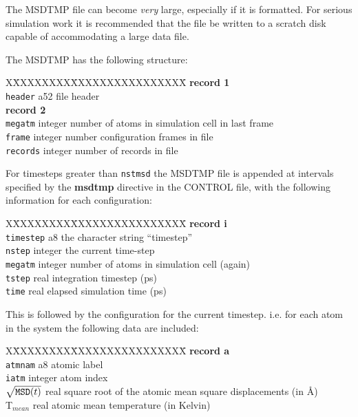 The MSDTMP file can become {\em very} large, especially if it is
formatted.  For serious simulation work it is recommended that the
file be written to a scratch disk capable of accommodating a large
data file.

The MSDTMP has the following structure:
\begin{tabbing}
X\=XXXXXXXX\=XXXXXXXXXXXXXXXX\=\kill
{\bf record 1} \\
\> {\tt header}  \> a52     \> file header \\
{\bf record 2} \\
\> {\tt megatm}  \> integer \> number of atoms in simulation cell in last frame \\
\> {\tt frame}   \> integer \> number configuration frames in file \\
\> {\tt records} \> integer \> number of records in file \\
\end{tabbing}

For timesteps greater than {\tt nstmsd} the MSDTMP file is
appended at intervals specified by the {\bf msdtmp} directive in the
CONTROL file, with the following information for each
configuration:
\begin{tabbing}
X\=XXXXXXXX\=XXXXXXXXXXXXXXXX\=\kill
{\bf record i} \\
\> {\tt timestep} \> a8      \> the character string ``timestep'' \\
\> {\tt nstep}    \> integer \> the current time-step \\
\> {\tt megatm}   \> integer \> number of atoms in simulation cell (again) \\
\> {\tt tstep}    \> real    \> integration timestep (ps) \\
\> {\tt time}     \> real    \> elapsed simulation time (ps) \\
\end{tabbing}
This is followed by the configuration for the current timestep. i.e.
for each atom in the system the following data are included:
\begin{tabbing}
X\=XXXXXXXX\=XXXXXXXXXXXXXXXX\=\kill
{\bf record a} \\
\> {\tt atmnam}           \> a8      \> atomic label \\
\> {\tt iatm}             \> integer \> atom index \\
\> $\sqrt{{\tt MSD}(t)}$  \> real    \> square root of the atomic mean square displacements (in \AA) \\
\> T$_{mean}$             \> real    \> atomic mean temperature (in Kelvin) \\
\end{tabbing}

